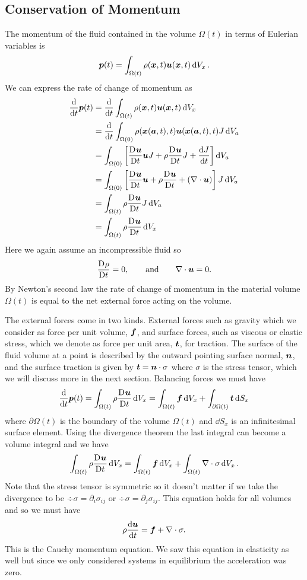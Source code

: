 \documentclass[a4paper]{article}
\newcommand{\mdv}[3][]{\frac{\mathrm{D}^{#1} #2}{\mathrm{D} {#3}^{#1}}}
\begin{document}
    \subsection{Conservation of Momentum}
    The momentum of the fluid contained in the volume \(\Omega(t)\) in terms of Eulerian variables is
    \[\bm{p}(t) = \int_{\Omega(t)} \rho(\bm{x}, t) \bm{u}(\bm{x}, t) \dd{V_x}.\]
    We can express the rate of change of momentum as
    \begin{align*}
        \dv{t}\vv{p}(t) &= \dv{t}\int_{\Omega(t)} \rho(\vv{x}, t) \vv{u}(\vv{x}, t) \dd{V_x}\\
        &= \dv{t} \int_{\Omega(0)} \rho(\vv{x}(\vv{a}, t), t) \vv{u}(\vv{x}(\vv{a}, t), t) J\dd{V_a}\\
        &= \int_{\Omega(0)} \left[ \mdv{\vv{u}}{t}\vv{u}J + \rho\mdv{\vv{u}}{t}J + \dv{J}{t} \right]\dd{V_a}\\
        &= \int_{\Omega(0)} \left[ \mdv{\vv{u}}{t}\vv{u} + \rho\mdv{\vv{u}}{t} + (\div\vv{u}) \right]J\dd{V_a}\\
        &= \int_{\Omega(t)} \rho\mdv{\vv{u}}{t}J\dd{V_a}\\
        &= \int_{\Omega(t)} \rho\mdv{\vv{u}}{t}\dd{V_x}
    \end{align*}
    Here we again assume an incompressible fluid so
    \[\mdv{\rho}{t} = 0, \qquad\text{and}\qquad \div\vv{u} = 0.\]
    By Newton's second law the rate of change of momentum in the material volume \(\Omega(t)\) is equal to the net external force acting on the volume.
    
    The external forces come in two kinds.
    External forces such as gravity which we consider as force per unit volume, \(\bm{f}\), and surface forces, such as viscous or elastic stress, which we denote as force per unit area, \(\bm{t}\), for traction.
    The surface of the fluid volume at a point is described by the outward pointing surface normal, \(\bm{n}\), and the surface traction is given by \(\bm{t} = \bm{n} \cdot\sigma\) where \(\sigma\) is the stress tensor, which we will discuss more in the next section.
    Balancing forces we must have
    \[\dv{t}\vv{p}(t) = \int_{\Omega(t)} \rho\mdv{\vv{u}}{t}\dd{V_x} = \int_{\Omega(t)} \vv{f}\dd{V_x} + \int_{\partial\Omega(t)} \vv{t}\dd{S_x}\]
    where \(\partial\Omega(t)\) is the boundary of the volume \(\Omega(t)\) and \(\dd{S_x}\) is an infinitesimal surface element.
    Using the divergence theorem the last integral can become a volume integral and we have
    \[\int_{\Omega(t)} \rho\mdv{\vv{u}}{t}\dd{V_x} = \int_{\Omega(t)} \vv{f}\dd{V_x} + \int_{\Omega(t)} \div\sigma \dd{V_x}.\]
    Note that the stress tensor is symmetric so it doesn't matter if we take the divergence to be \(\div\sigma = \partial_i\sigma_{ij}\) or \(\div\sigma = \partial_j\sigma_{ij}\).
    This equation holds for all volumes and so we must have
    \begin{equation}\label{eqn:cauchy momentum eqn}
        \rho\dv{\bm{u}}{t} = \bm{f} + \nabla\cdot\sigma.
    \end{equation}
    This is the Cauchy momentum equation.
    We saw this equation in elasticity as well but since we only considered systems in equilibrium the acceleration was zero.
    
\end{document}

